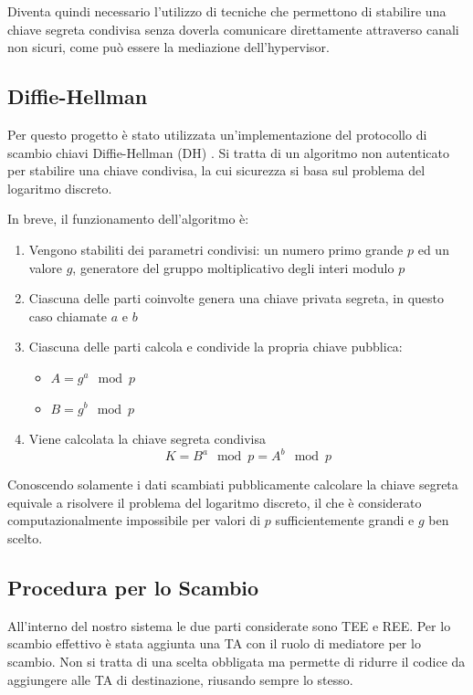 \documentclass[12pt,italian]{report}
\begin{document}
	Diventa quindi necessario l'utilizzo di tecniche che permettono di stabilire una chiave segreta condivisa senza doverla comunicare direttamente attraverso canali non sicuri, come può essere la mediazione dell'hypervisor.
	
	\subsection{Diffie-Hellman}
	\label{subsec:dh}
	Per questo progetto è stato utilizzata un'implementazione del protocollo di scambio chiavi Diffie-Hellman (DH) \cite{dhexchange}. Si tratta di un algoritmo non autenticato per stabilire una chiave condivisa, la cui sicurezza si basa sul problema del logaritmo discreto.
	
	In breve, il funzionamento dell'algoritmo è:
	\begin{enumerate}
		\item Vengono stabiliti dei parametri condivisi: un numero primo grande $p$ ed un valore $g$, generatore del gruppo moltiplicativo degli interi modulo $p$ 
		\item Ciascuna delle parti coinvolte genera una chiave privata segreta, in questo caso chiamate $a$ e $b$
		\item Ciascuna delle parti calcola e condivide la propria chiave pubblica:
		\begin{itemize}[noitemsep,nolistsep,label=$-$]
			\item $A = g^a \mod p$
			\item $B = g^b \mod p$
		\end{itemize}
		\item Viene calcolata la chiave segreta condivisa
		$$ K = B^a \mod p = A^b \mod p $$
	\end{enumerate}
	Conoscendo solamente i dati scambiati pubblicamente calcolare la chiave segreta equivale a risolvere il problema del logaritmo discreto, il che è considerato computazionalmente impossibile per valori di $p$ sufficientemente grandi e $g$ ben scelto.
	
	\subsection{Procedura per lo Scambio}
	\label{subsec:proc_scambio}
	All'interno del nostro sistema le due parti considerate sono TEE e REE. Per lo scambio effettivo è stata aggiunta una TA con il ruolo di mediatore per lo scambio. Non si tratta di una scelta obbligata ma permette di ridurre il codice da aggiungere alle TA di destinazione, riusando sempre lo stesso. 
	
\end{document}

